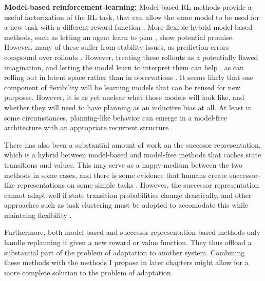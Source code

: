 \textbf{Model-based reinforcement-learning:} Model-based RL methods provide a useful factorization of the RL task, that can allow the same model to be used for a new task with a different reward function \citep[e.g.][]{Laroche2017}. More flexible hybrid model-based methods, such as letting an agent learn to plan \citep{Tamar2017}, show potential promise. However, many of these suffer from stability issues, as prediction errors compound over rollouts \citep{Talvitie2014}. However, treating these rollouts as a potentially flawed imagination, and letting the model learn to interpret them can help \citep{Racaniere2017}, as can rolling out in latent space rather than in observations \citep{Gregor2019}. It seems likely that one component of flexibility will be learning models that can be reused for new purposes. However, it is as yet unclear what those models will look like, and whether they will need to have planning as an inductive bias at all. At least in some circumstances, planning-like behavior can emerge in a model-free architecture with an appropriate recurrent structure \cite{Guez2019}. \par
There has also been a substantial amount of work on the succesor representation, which is a hybrid between model-based and model-free methods that caches state transitions and values. This may serve as a happy-medium between the two methods in some cases, and there is some evidence that humans create successor-like representations on some simple tasks \citep{Momennejad2017}. However, the successor representation cannot adapt well if state transition probabilities change drastically, and other approaches such as task clustering must be adopted to accomodate this while maintaing flexibility \citep{Madarasz2019}. \par
Furthermore, both model-based and successor-representation-based methods only handle replanning if given a new reward or value function. They thus offload a substantial part of the problem of adaptation to another system. Combining these methods with the methods I propose in later chapters might allow for a more complete solution to the problem of adaptation.\par

